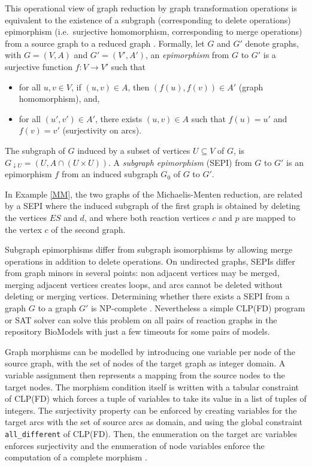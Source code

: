 \documentclass[graybox]{svmult}
\begin{document}
This operational view of graph reduction by graph transformation operations
is equivalent to the existence of a subgraph (corresponding to delete operations) epimorphism (i.e.\ surjective homomorphism, corresponding to merge operations) from a source graph to a reduced graph \cite{GSF10bi}.
Formally, let $G$ and $G'$ denote graphs, with $G = (V, A)$ and $G' = (V', A')$,
  an {\em epimorphism} from $G$ to $G'$ is a surjective function $f: V \rightarrow V'$
  such that
  \begin{itemize}
  \item for all $u, v \in V$, if $(u, v) \in A$, then $(f(u),f(v))\in A'$ (graph homomorphism), and,
  \item for all $(u', v') \in A'$, there exists $(u, v) \in A$ such that $f(u) = u'$ and $f(v) = v'$
    (surjectivity on arcs).
  \end{itemize}
  The {subgraph} of $G$ induced by a subset of vertices $U\subseteq V$ of $G$, is $G_{\downarrow U}=(U,A \cap (U\times U))$.
  A {\em  subgraph epimorphism} (SEPI) from $G$ to $G'$ is an epimorphism $f$ from an induced subgraph $G_0$ of $G$ to $G'$.

In Example \ref{MM}, the two graphs of the Michaelis-Menten reduction,
are related by a SEPI where the induced subgraph 
of the first graph is obtained by deleting the vertices $ES$ and $d$,
and where both reaction vertices $c$ and $p$ are mapped to the vertex $c$ of the second graph.

Subgraph epimorphisms differ from subgraph isomorphisms 
by allowing merge operations in addition to delete operations.
On undirected graphs, SEPIs differ from graph minors %
in several points: non adjacent vertices may be merged,
 merging adjacent vertices creates loops, 
and arcs cannot be deleted without deleting or merging vertices.
Determining whether there exists a SEPI from a graph $G$ to a graph $G'$ is NP-complete \cite{GFMSS14dam}.
Nevertheless a simple CLP(FD) program or SAT solver can solve this problem on all pairs of reaction graphs in the repository BioModels
with just a few timeouts for some pairs of models.

Graph morphisms can be modelled by introducing one variable per node of the source graph,
with  the set of  nodes of the target graph as integer domain.
A variable assignment then represents a mapping from the source nodes to the target nodes.
The morphism condition itself is written with  a tabular constraint of CLP(FD) %
which forces a tuple of variables to take its value in a list of tuples of integers.
The surjectivity property can be enforced by creating variables for the target arcs
with the set of source arcs as domain, and using the global constraint
{\tt all\_different} of CLP(FD).
Then, the enumeration on the target arc variables
enforces surjectivity and  the enumeration of node variables enforce the
computation of a complete morphism \cite{GFMSS14dam}.
\end{document}
